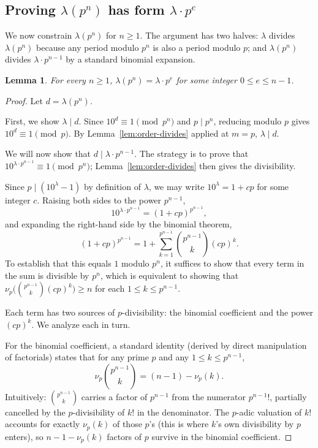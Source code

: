 \documentclass[12pt]{amsart}
\newtheorem{lemma}[theorem]{Lemma}
\theoremstyle{definition}
\theoremstyle{remark}
\begin{document}
\subsection{Proving $\lambda(p^n)$ has form $\lambda \cdot p^e$}\label{subsec:form}

We now constrain $\lambda(p^n)$ for $n \ge 1$. The argument has two 
halves: $\lambda$ divides $\lambda(p^n)$ because any period modulo 
$p^n$ is also a period modulo $p$; and $\lambda(p^n)$ divides 
$\lambda \cdot p^{n-1}$ by a standard binomial expansion.

\begin{lemma}\label{lem:form-lambda-pe}
For every $n \ge 1$, $\lambda(p^n) = \lambda \cdot p^e$ for some integer 
$0 \le e \le n - 1$.
\end{lemma}

\begin{proof}
Let $d = \lambda(p^n)$. 

\smallskip

First, we show $\lambda \mid d$. Since $10^d \equiv 1 \pmod{p^n}$ and 
$p \mid p^n$, reducing modulo $p$ gives $10^d \equiv 1 \pmod{p}$. By 
Lemma~\ref{lem:order-divides} applied at $m = p$, $\lambda \mid d$. 

We will now show that $d \mid \lambda \cdot p^{n-1}$. The strategy is 
to prove that $10^{\lambda \cdot p^{n-1}} \equiv 1 \pmod{p^n}$; 
Lemma~\ref{lem:order-divides} then gives the divisibility.

Since $p \mid (10^\lambda - 1)$ by definition of $\lambda$, we may 
write $10^\lambda = 1 + cp$ for some integer $c$. Raising both sides 
to the power $p^{n-1}$,
\[
  10^{\lambda \cdot p^{n-1}} = (1 + cp)^{p^{n-1}},
\]
and expanding the right-hand side by the binomial theorem,
\[
  (1 + cp)^{p^{n-1}} = 1 + \sum_{k=1}^{p^{n-1}} \binom{p^{n-1}}{k} 
  (cp)^k.
\]
To establish that this equals $1$ modulo $p^n$, it suffices to show 
that every term in the sum is divisible by $p^n$, which is equivalent to showing that 
$\nu_p\!\bigl(\binom{p^{n-1}}{k}(cp)^k\bigr) \ge n$ for each 
$1 \le k \le p^{n-1}$.

Each term has two sources of $p$-divisibility: the binomial coefficient 
and the power $(cp)^k$. We analyze each in turn.

For the binomial coefficient, a standard identity (derived by direct manipulation of factorials) states that 
for any prime $p$ and any $1 \le k \le p^{n-1}$,
\[
  \nu_p\!\binom{p^{n-1}}{k} = (n-1) - \nu_p(k).
\]
Intuitively: $\binom{p^{n-1}}{k}$ carries a factor of $p^{n-1}$ from 
the numerator $p^{n-1}!$, partially cancelled by the $p$-divisibility 
of $k!$ in the denominator. The $p$-adic valuation of $k!$ accounts 
for exactly $\nu_p(k)$ of those $p$'s (this is where $k$'s own 
divisibility by $p$ enters), so $n - 1 - \nu_p(k)$ factors of $p$ 
survive in the binomial coefficient.


\end{proof}
\end{document}

